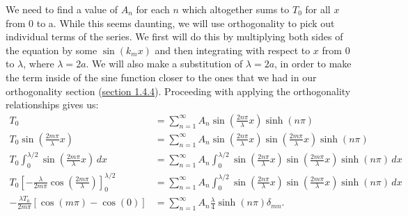 \documentclass[11pt]{report}
\newcommand{\fpar}[1]{\left({#1}\right)}
\newcommand{\fbrac}[1]{\left[{#1}\right]}
\begin{document}
We need to find a value of $A_n$ for each $n$ which altogether sums to $T_0$ for all $x$ from 0 to a. While this seems daunting, we will use orthogonality to pick out individual terms of the series. We first will do this by multiplying both sides of the equation by some $\sin\fpar{k_m x}$ and then integrating with respect to $x$ from $0$ to $\lambda$, where $\lambda = 2a$. We will also make a substitution of $\lambda = 2a$, in order to make the term inside of the sine function closer to the ones that we had in our orthogonality section (\hyperlink{subsection.1.4.4}{section 1.4.4}). Proceeding with applying the orthogonality relationships gives us:
    \begin{align*}
        T_0 &= \sum_{n=1}^\infty A_n\sin\fpar{\frac{2n\pi}{\lambda}x}\sinh\fpar{n\pi}\\
        T_0\sin\fpar{\frac{2m\pi}{\lambda}x} &= \sum_{n=1}^\infty A_n\sin\fpar{\frac{2n\pi}{\lambda}x}\sin\fpar{\frac{2m\pi}{\lambda}x}\sinh\fpar{n\pi}\\
        T_0\int_0^{\lambda/2}\sin\fpar{\frac{2m\pi}{\lambda}x}\,dx &= \sum_{n=1}^\infty A_n\int_0^{\lambda/2}\sin\fpar{\frac{2n\pi}{\lambda}x}\sin\fpar{\frac{2m\pi}{\lambda}x}\sinh\fpar{n\pi}\,dx\\
        T_0\fbrac{-\frac{\lambda}{2m\pi}\cos\fpar{\frac{2m\pi}{\lambda}}}_0^{\lambda/2} &= \sum_{n=1}^\infty A_n\int_0^{\lambda/2}\sin\fpar{\frac{2n\pi}{\lambda}x}\sin\fpar{\frac{2m\pi}{\lambda}x}\sinh\fpar{n\pi}\,dx\\
        -\frac{\lambda T_0}{2m\pi}\fbrac{\cos\fpar{m\pi}-\cos(0)} &= \sum_{n=1}^\infty A_n\frac{\lambda}{4}\sinh\fpar{n\pi}\delta_{mn}.
    \end{align*}
\end{document}
